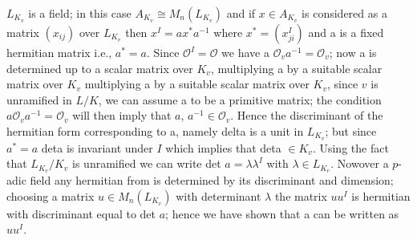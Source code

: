  \begin{romancase} %
$L_{K_v}$ is a field; in this case $A_{K_v} \cong M_n (L_{K_v})$ and
   if $x \in A_{K_v}$ is considered as a matrix $(x_{ij})$ over
   $L_{K_v}$ then $x^I = ax^* a ^{-1}$ where $x^* = (x^I_{ji})$ and a is
   a fixed hermitian matrix i.e., $a^* =a$. Since $\mathscr{O}^I =
   \mathscr{O}$ we have a $\mathscr{O}_v a ^{-1} = \mathscr{O}_v$; now
   a is determined up to a scalar matrix over $K_v$, multiplying a by
   a suitable scalar matrix over $K_v$ multiplying a by a suitable
   scalar matrix over $K_v$, since $v$ is unramified in $L/K$, we can
   assume a to be a primitive matrix; the condition $a \mathscr{O}_v
   a^{-1} = \mathscr {O}_v$ will then imply that $a$, $a^{-1} \in
   \mathscr{O}_v$. Hence the discriminant of the hermitian form
   corresponding to a, namely delta is a unit in $L_{K_v}$; but since
   $a^* = a$ deta is invariant under $I$ which implies that deta $\in
   K_v$. Using the fact that $L_{K_v}/ K_v$ is unramified we can write
   det $a = \lambda \lambda^I$ with $\lambda \in
   L_{K_v}$. Now\pageoriginale over a 
   $p$-adic field any hermitian from is determined by its discriminant
   and dimension; choosing a matrix $u \in M_n (L_{K_v})$ with
   determinant $\lambda$ the matrix $uu^I$ is hermitian with
   discriminant equal to det $a$; hence we have shown that a can be
   written as $uu^I$. 
\end{romancase} 
 
